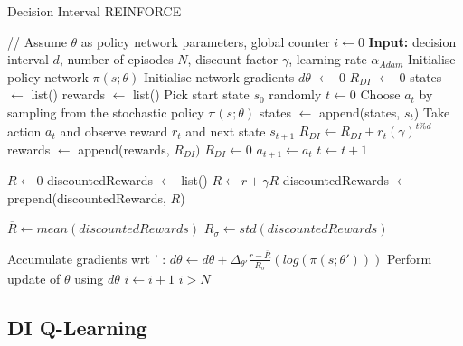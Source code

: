 \documentclass{article}
\begin{document}
\begin{algorithm}
\caption{Decision Interval REINFORCE}
\label{alg:reinforce}
\begin{algorithmic}
\STATE // Assume $\theta$ as policy network parameters, global counter $i \gets 0$ 
\STATE \textbf{Input:} decision interval $d$, number of episodes $N$, discount factor $\gamma$, learning rate $\alpha_{Adam}$
\STATE Initialise policy network $\pi(s; \theta)$
\STATE Initialise network gradients $d\theta$ $\gets$ 0
\REPEAT 
    \STATE $R_{DI}$ $\gets$ 0
    \STATE states $\gets$ list()
    \STATE rewards $\gets$ list()
    \STATE Pick start state $s_0$ randomly
    \STATE $t \gets 0$
            \STATE Choose $a_t$ by sampling from the stochastic policy $\pi(s; \theta)$
            \STATE states $\gets$ append(states, $s_{t}$)    
        \ENDIF
        \STATE Take action $a_t$ and observe reward $r_t$ and next state $s_{t+1}$ 
        \STATE $R_{DI} \gets R_{DI} + r_t (\gamma)^{t \% d} $
            \STATE rewards $\gets$ append(rewards, $R_{DI})$
            \STATE $R_{DI} \gets 0$ 
        \ENDIF
        \STATE $a_{t + 1} \gets a_t$
        \STATE $t \gets t + 1$
    \ENDWHILE
    
    \STATE $R \gets 0$
    \STATE discountedRewards $\gets$ list()
        \STATE $R \gets r + \gamma R$
        \STATE discountedRewards $\gets$ prepend(discountedRewards, $R$)
    \ENDFOR
    
    \STATE $\overline{R} \gets mean(discountedRewards)$
    \STATE $R_\sigma \gets std(discountedRewards)$
    
        \STATE Accumulate gradients wrt \theta' : $d\theta \gets d\theta + \Delta_{\theta'} { \frac{r - \overline{R}}{R_\sigma} (log(\pi(s; \theta'))) } $
    \ENDFOR
    \STATE Perform update of $\theta$ using $d\theta$
    \STATE $i \gets i + 1$
\UNTIL $i > N$


\end{algorithmic}
\end{algorithm}

\subsection{DI Q-Learning}
\end{document}
